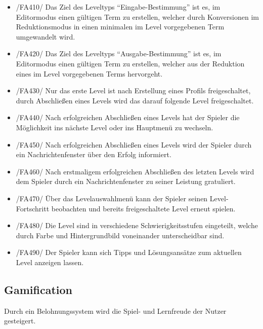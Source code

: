 \begin{itemize}
\item /FA410/ Das Ziel des Leveltyps "`Eingabe-Bestimmung"' ist es, im Editormodus einen gültigen Term zu erstellen, welcher durch Konversionen im Reduktionsmodus in einen minimalen im Level vorgegebenen Term umgewandelt wird.
\item /FA420/ Das Ziel des Leveltyps "`Ausgabe-Bestimmung"' ist es, im Editormodus einen gültigen Term zu erstellen, welcher aus der Reduktion eines im Level vorgegebenen Terms hervorgeht.
\item /FA430/ Nur das erste Level ist nach Erstellung eines Profils freigeschaltet, durch Abschließen eines Levels wird das darauf folgende Level freigeschaltet.
\item /FA440/ Nach erfolgreichen Abschließen eines Levels hat der Spieler die Möglichkeit ins nächste Level oder ins Hauptmenü zu wechseln.
\item /FA450/ Nach erfolgreichen Abschließen eines Levels wird der Spieler durch ein Nachrichtenfenster über den Erfolg informiert.
\item /FA460/ Nach erstmaligem erfolgreichen Abschließen des letzten Levels wird dem Spieler durch ein Nachrichtenfenster zu seiner Leistung gratuliert.
\item /FA470/ Über das Levelauswahlmenü kann der Spieler seinen Level-Fortschritt beobachten und bereits freigeschaltete Level erneut spielen.
\item /FA480/ Die Level sind in verschiedene Schwierigkeitsstufen eingeteilt, welche durch Farbe und Hintergrundbild voneinander unterscheidbar sind.
\item /FA490/ Der Spieler kann sich Tipps und Lösungsansätze zum aktuellen Level anzeigen lassen.
\end{itemize}

\subsection{Gamification}

Durch ein Belohnungssystem wird die Spiel- und Lernfreude der Nutzer gesteigert.

